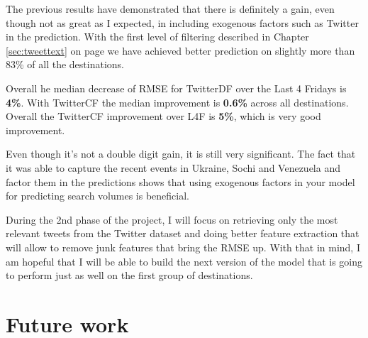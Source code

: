 \documentclass[minf,twoside,singlespacing,parskip,frontabs]{infthesis}
\begin{document}
The previous results have demonstrated that there is definitely a gain, even though not as great as I expected, in including exogenous factors such as Twitter in the prediction. With the first level of filtering described in Chapter \ref{sec:tweettext} on page \pageref{sec:tweettext} we have achieved better prediction on slightly more than 83\% of all the destinations.  


Overall he median decrease of RMSE for TwitterDF over the Last 4 Fridays is \textbf{4\%}. With TwitterCF the median improvement is \textbf{0.6\%} across all destinations. Overall the TwitterCF improvement over L4F is \textbf{5\%}, which is very good improvement. 


Even though it's not a double digit gain, it is still very significant. The fact that it was able to capture the recent events in Ukraine, Sochi and Venezuela and factor them in the predictions shows that using exogenous factors in your model for predicting search volumes is beneficial.


During the 2nd phase of the project, I will focus on retrieving only the most relevant tweets from the Twitter dataset and doing better feature extraction that will allow to remove junk features that bring the RMSE up. With that in mind, I am hopeful that I will be able to build the next version of the model that is going to perform just as well on the first group of destinations. 


\chapter{Future work}
\label{chap:future-work}







\end{document}
